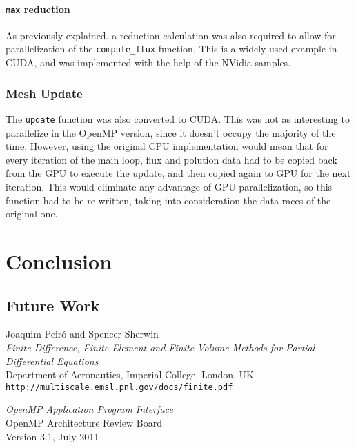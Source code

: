\documentclass[9pt,twocolumn]{scrartcl}
\newcommand{\paragraphh}[1]{\paragraph{#1\hfill}\hfill

}
\begin{document}
\paragraphh{\texttt{max} reduction}
As previously explained, a reduction calculation was also required to allow for parallelization of the \texttt{compute\_flux} function. This is a widely used example in CUDA, and was implemented with the help of the NVidia samples.

\subsubsection{Mesh Update}
The \texttt{update} function was also converted to CUDA. This was not as interesting to parallelize in the OpenMP version, since it doesn't occupy the majority of the time. However, using the original CPU implementation would mean that for every iteration of the main loop, flux and polution data had to be copied back from the GPU to execute the update, and then copied again to GPU for the next iteration. This would eliminate any advantage of GPU parallelization, so this function had to be re-written, taking into consideration the data races of the original one.

\section{Conclusion}
\subsection{Future Work}



\begin{thebibliography}{12345}

	Joaquim Peiró and Spencer Sherwin	\\
	\textit{Finite Difference, Finite Element and Finite Volume Methods for Partial Differential Equations}	\\
	Department of Aeronautics, Imperial College, London, UK	\\
	\texttt{\smaller http://multiscale.emsl.pnl.gov/docs/finite.pdf}

	\textit{OpenMP Application Program Interface}	\\
	OpenMP Architecture Review Board	\\
	Version 3.1, July 2011

\end{thebibliography}
\end{document}
